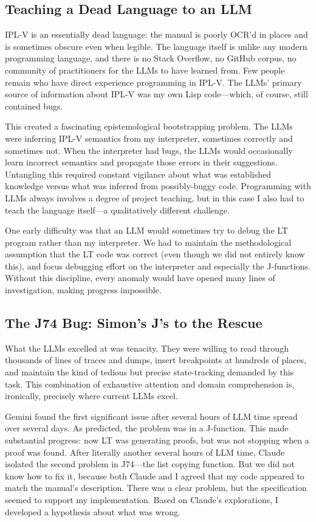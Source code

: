 \documentclass[journal]{IEEEtran}
\begin{document}
\subsection{Teaching a Dead Language to an LLM}

IPL-V is an essentially dead language: the manual is poorly OCR'd in
places and is sometimes obscure even when legible. The language itself
is unlike any modern programming language, and there is no Stack
Overflow, no GitHub corpus, no community of practitioners for the LLMs
to have learned from. Few people remain who have direct experience
programming in IPL-V.  The LLMs' primary source of information about
IPL-V was my own Lisp code---which, of course, still contained bugs.

This created a fascinating epistemological bootstrapping problem. The
LLMs were inferring IPL-V semantics from my interpreter, sometimes
correctly and sometimes not. When the interpreter had bugs, the LLMs
would occasionally learn incorrect semantics and propagate those
errors in their suggestions. Untangling this required constant
vigilance about what was established knowledge versus what was
inferred from possibly-buggy code. Programming with LLMs always
involves a degree of project teaching, but in this case I also had to
teach the language itself---a qualitatively different challenge.

One early difficulty was that an LLM would sometimes try to debug the
LT program rather than my interpreter. We had to maintain the
methodological assumption that the LT code was correct (even though we
did not entirely know this), and focus debugging effort on the
interpreter and especially the J-functions. Without this discipline,
every anomaly would have opened many lines of investigation, making
progress impossible.

\subsection{The J74 Bug: Simon's J's to the Rescue}

What the LLMs excelled at was tenacity. They were willing to read
through thousands of lines of traces and dumps, insert breakpoints at
hundreds of places, and maintain the kind of tedious but precise
state-tracking demanded by this task. This combination of exhaustive
attention and domain comprehension is, ironically, precisely where
current LLMs excel.

Gemini found the first significant issue after several hours of LLM
time spread over several days. As predicted, the problem was in a
J-function. This made substantial progress: now LT was generating
proofs, but was not stopping when a proof was found. After literally
another several hours of LLM time, Claude isolated the second problem
in J74---the list copying function. But we did not know how to fix it,
because both Claude and I agreed that my code appeared to match the
manual's description. There was a clear problem, but the specification
seemed to support my implementation. Based on Claude's explorations, I
developed a hypothesis about what was wrong.
\end{document}
